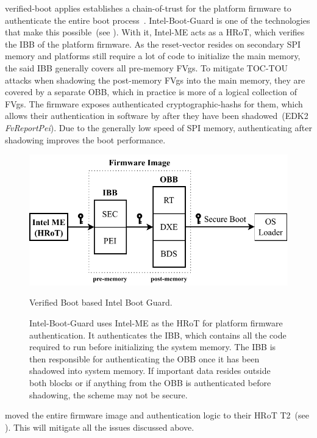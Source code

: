 \Gls{verified-boot} applies establishes a \gls{chain-of-trust} for the platform \gls{firmware} to authenticate the entire boot process~\cite{uefi-secure-boot}. \Gls{Intel-Boot-Guard} is one of the technologies that make this possible~(see ). With it, \gls{Intel-ME} acts as a \gls{HRoT}, which verifies the \gls{IBB} of the platform \gls{firmware}. As the \gls{reset-vector} resides on secondary \gls{SPI} memory and  platforms still require a lot of code to initialize the main memory, the said \gls{IBB} generally covers all pre-memory \glspl{FVg}. To mitigate \gls{TOC-TOU} attacks when shadowing the post-memory \glspl{FVg} into the main memory, they are covered by a separate \gls{OBB}, which in practice is more of a logical collection of \glspl{FVg}. The \gls{firmware} exposes authenticated \glspl{cryptographic-hash} for them, which allows their authentication in software by  after they have been shadowed~(\gls{EDK2} \textit{FvReportPei}). Due to the generally low speed of \gls{SPI} memory, authenticating after shadowing improves the boot performance.

\begin{figure}[htb]
  \centering
  \includegraphics{Figures/BGRoT.pdf}
  \caption{Verified Boot based Intel Boot Guard.}
  \label{fig:boot-guard}
  \caption*{\Gls{Intel-Boot-Guard} uses \gls{Intel-ME} as the \gls{HRoT} for platform \gls{firmware} authentication. It authenticates the \gls{IBB}, which contains all the code required to run before initializing the system memory. The \gls{IBB} is then responsible for authenticating the \gls{OBB} once it has been shadowed into system memory. If important data resides outside both blocks or if anything from the \gls{OBB} is authenticated before shadowing, the scheme may not be secure.}
\end{figure}

 moved the entire \gls{firmware} image and authentication logic to their \gls{HRoT}  T2~(see ). This will mitigate all the issues discussed above.

